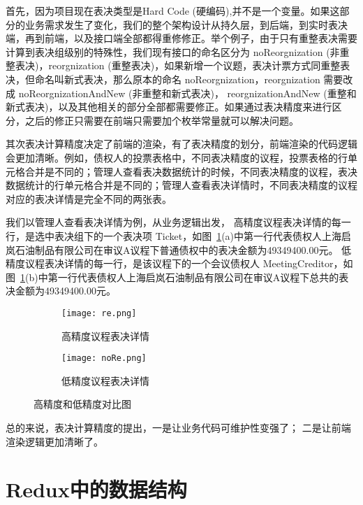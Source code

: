   首先，因为项目现在表决类型是Hard Code (硬编码),并不是一个变量。如果这部分的业务需求发生了变化，我们的整个架构设计从持久层，到后端，到实时表决端，再到前端，以及接口端全部都得重修修正。举个例子，由于只有重整表决需要计算到表决组级别的特殊性，我们现有接口的命名区分为 noReorgnization (非重整表决)，reorgnization (重整表决)，如果新增一个议题，表决计票方式同重整表决，但命名叫新式表决，那么原本的命名 noReorgnization，reorgnization 需要改成 noReorgnizationAndNew (非重整和新式表决)， reorgnizationAndNew (重整和新式表决)，以及其他相关的部分全部都需要修正。如果通过表决精度来进行区分，之后的修正只需要在前端只需要加个枚举常量就可以解决问题。

  其次表决计算精度决定了前端的渲染，有了表决精度的划分，前端渲染的代码逻辑会更加清晰。例如，债权人的投票表格中，不同表决精度的议程，投票表格的行单元格合并是不同的；管理人查看表决数据统计的时候，不同表决精度的议程，表决数据统计的行单元格合并是不同的；管理人查看表决详情时，不同表决精度的议程对应的表决详情是完全不同的两张表。
  
  我们以管理人查看表决详情为例，从业务逻辑出发，
  高精度议程表决详情的每一行，是选中表决组下的一个表决项 Ticket，如图~\ref{fig:reAndNoRe}(a)中第一行代表债权人上海启岚石油制品有限公司在审议A议程下普通债权中的表决金额为49349400.00元。
  低精度议程表决详情的每一行，是该议程下的一个会议债权人 MeetingCreditor，如图~\ref{fig:reAndNoRe}(b)中第一行代表债权人上海启岚石油制品有限公司在审议A议程下总共的表决金额为49349400.00元。

  \begin{figure}[!htp]
    \centering
    \begin{subfigure}{0.45\textwidth}
      \centering
      \texttt{[image: re.png]}
      \caption{高精度议程表决详情}
    \end{subfigure}
    \hspace{1cm}
    \begin{subfigure}{0.45\textwidth}
      \centering
      \texttt{[image: noRe.png]}
      \caption{低精度议程表决详情}
    \end{subfigure}
    \caption{高精度和低精度对比图}
    \label{fig:reAndNoRe}
  \end{figure}

  总的来说，表决计算精度的提出，一是让业务代码可维护性变强了；
  二是让前端渲染逻辑更加清晰了。

  \section{Redux中的数据结构}

